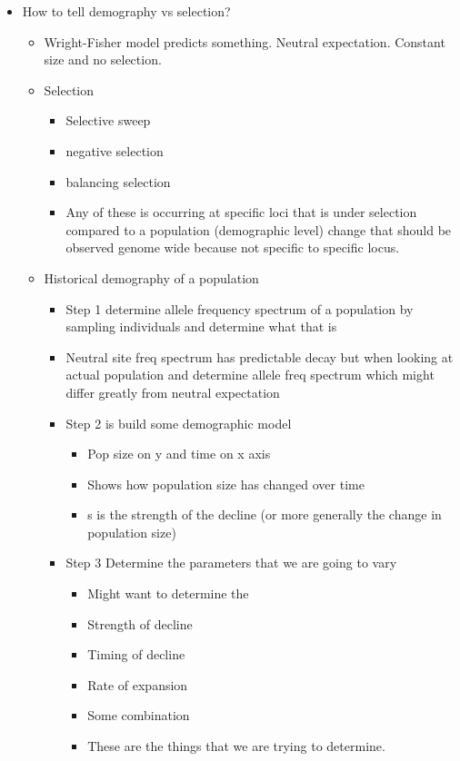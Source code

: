 \documentclass[11pt]{article}
\begin{document}
\begin{itemize}
	\item How to tell demography vs selection?
	\begin{itemize}
		\item Wright-Fisher model predicts something. Neutral expectation. Constant size and no selection.
		\item Selection
		\begin{itemize}
			\item Selective sweep
			\item negative selection
			\item balancing selection 
			\item Any of these is occurring at specific loci that is under selection compared to a population (demographic level) change that should be observed genome wide because not specific to specific locus. 
		\end{itemize}
		\item Historical demography of a population
		\begin{itemize}
			\item Step 1 determine allele frequency spectrum of a population by sampling individuals and determine what that is 
			\item Neutral site freq spectrum has predictable decay but when looking at actual population and determine allele freq spectrum which might differ greatly from neutral expectation
			\item Step 2 is build some demographic model
			\begin{itemize}
				\item Pop size on y and time on x axis
				\item Shows how population size has changed over time
				\item s is the strength of the decline (or more generally the change in population size)
			\end{itemize}
			\item Step 3 Determine the parameters that we are going to vary
			\begin{itemize}
				\item Might want to determine the
					\item Strength of decline
					\item Timing of decline
					\item Rate of expansion
					\item Some combination
					\item These are the things that we are trying to determine. 

\end{itemize}
\end{itemize}
\end{itemize}
\end{itemize}
\end{document}
